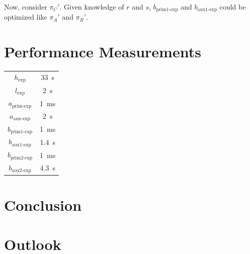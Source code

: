\documentclass{article}
\begin{document}
Now, consider $\pi_C'$.
Given knowledge of $r$ and $s$, $b_\text{prim1-exp}$ and $b_\text{aux1-exp}$ could be optimized like $\pi_A'$ and $\pi_B'$.


\section{Performance Measurements} \label{sec:benchmarks}

\begin{center}
\begin{tabular}{ c c }
        $h_\text{exp} $ & \SI{33}{\second} \\
        $l_\text{exp}$ & \SI{2}{\second} \\
        $a_\text{prim-exp}$ & \SI{1}{\milli\second} \\
        $a_\text{aux-exp}$ & \SI{2}{\second} \\
        $b_\text{prim1-exp}$ & \SI{1}{\milli\second} \\
        $b_\text{aux1-exp}$ & \SI{1.4}{\second} \\
        $b_\text{prim2-exp}$ & \SI{1}{\milli\second} \\
        $b_\text{aux2-exp}$ & \SI{4.3}{\second}
\end{tabular}
\end{center}


\section{Conclusion}

\section{Outlook}
\end{document}
